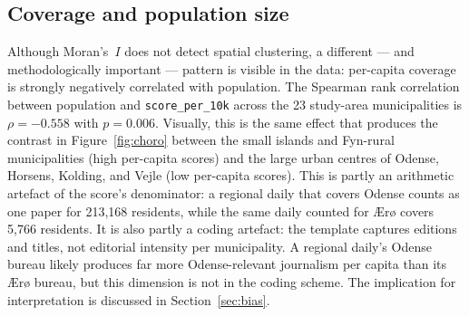 \documentclass[12pt, a4paper]{article}
\begin{document}
\subsection{Coverage and population size}
\label{sec:popcorr}
Although Moran's~$I$ does not detect spatial clustering, a different --- and
methodologically important --- pattern is visible in the data: per-capita coverage
is strongly negatively correlated with population. The Spearman rank correlation
between population and \texttt{score\_per\_10k} across the 23 study-area
municipalities is $\rho = -0.558$ with $p = 0.006$. Visually, this is the same
effect that produces the contrast in Figure~\ref{fig:choro} between the small
islands and Fyn-rural municipalities (high per-capita scores) and the large urban
centres of Odense, Horsens, Kolding, and Vejle (low per-capita scores).
This is partly an arithmetic artefact of the score's denominator: a regional daily
that covers Odense counts as one paper for 213{,}168 residents, while the same
daily counted for Ærø covers 5{,}766 residents. It is also partly a coding
artefact: the template captures editions and titles, not editorial intensity per
municipality. A regional daily's Odense bureau likely produces far more
Odense-relevant journalism per capita than its Ærø bureau, but this dimension is
not in the coding scheme. The implication for interpretation is discussed in
Section~\ref{sec:bias}.
\end{document}
